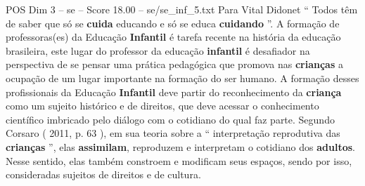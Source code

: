 \begin{textsample}{POS Dim 3 – se – Score 18.00 – se/se\_inf\_5.txt}
Para Vital Didonet “ Todos têm de saber que só se \textbf{cuida} educando e só se educa \textbf{cuidando} ”.
A formação de professoras(es) da Educação \textbf{Infantil} é tarefa recente na história da educação brasileira, este lugar do professor da educação \textbf{infantil} é desafiador na perspectiva de se pensar uma prática pedagógica que promova nas \textbf{crianças} a ocupação de um lugar importante na formação do ser humano.
A formação desses profissionais da Educação \textbf{Infantil} deve partir do reconhecimento da \textbf{criança} como um sujeito histórico e de direitos, que deve acessar o conhecimento científico imbricado pelo diálogo com o cotidiano do qual faz parte.
Segundo Corsaro ( 2011, p. 63 ), em sua teoria sobre a “ interpretação reprodutiva das \textbf{crianças} ”, elas \textbf{assimilam}, reproduzem e interpretam o cotidiano dos \textbf{adultos}.
Nesse sentido, elas também constroem e modificam seus espaços, sendo por isso, consideradas sujeitos de direitos e de cultura.

\end{textsample}
